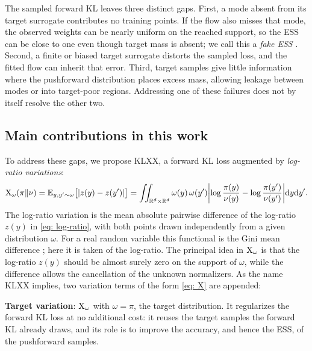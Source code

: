 \documentclass{article}
\begin{document}
The sampled forward KL leaves three distinct gaps. First, a mode absent from its target surrogate contributes no training points. If the flow also misses that mode, the observed weights can be nearly uniform on the reached support, so the ESS can be close to one even though target mass is absent; we call this a \emph{fake ESS} \citep{noe2019boltzmann,midgley2022flow}. Second, a finite or biased target surrogate distorts the sampled loss, and the fitted flow can inherit that error. Third, target samples give little information where the pushforward distribution places excess mass, allowing leakage between modes or into target-poor regions. Addressing one of these failures does not by itself resolve the other two.

\subsection{Main contributions in this work}
To address these gaps, we propose KLXX, a forward KL loss augmented by \emph{log-ratio variations}:
\begin{equation}
	\mathrm{X}_\omega(\pi\|\nu) = \mathbb E_{y,y'\sim \omega} \big[|z(y)-z(y')|\big] = \iint_{\mathbb R^d\times\mathbb R^d} \omega(y)\,\omega(y')
	\biggl|\log\frac{\pi(y)}{\nu(y)} - \log\frac{\pi(y')}{\nu(y')}\biggr| \mathrm{d} y\mathrm{d} y'.
	\label{eq: X}
\end{equation}
The log-ratio variation is the mean absolute pairwise difference of the log-ratio $z(y)$ in \eqref{eq: log-ratio}, with both points drawn independently from a given distribution $\omega$. {\color{blue}For a real random variable this functional is the Gini mean difference \citep{yitzhaki2003gini}; here it is taken of the log-ratio.}
The principal idea in $\mathrm{X}_\omega$ is that the log-ratio $z(y)$ should be almost surely zero on the support of $\omega$, while the difference allows the cancellation of the unknown normalizers.
As the name KLXX implies, two variation terms of the form \eqref{eq: X} are appended:

\textbf{Target variation}: $\mathrm{X}_\omega$ with $\omega = \pi$, the target distribution. It regularizes the forward KL loss at no additional cost: it reuses the target samples the forward KL already draws, and {\color{blue}its role is to improve} the accuracy, and hence the ESS, of the pushforward samples.
\end{document}
